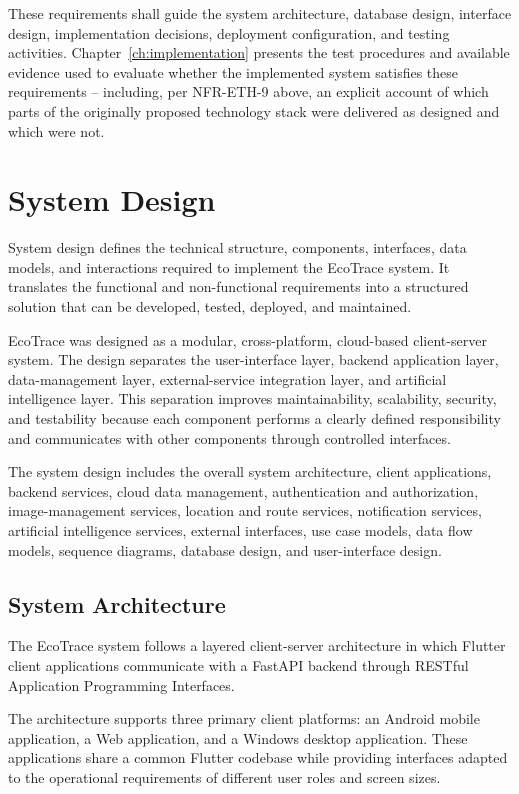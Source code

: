 These requirements shall guide the system architecture, database design,
interface design, implementation decisions, deployment configuration, and
testing activities. Chapter~\ref{ch:implementation} presents the test procedures
and available evidence used to evaluate whether the implemented system
satisfies these requirements -- including, per NFR-ETH-9 above, an explicit
account of which parts of the originally proposed technology stack were
delivered as designed and which were not.

\section{System Design}
\label{sec:system-design}

System design defines the technical structure, components, interfaces, data
models, and interactions required to implement the EcoTrace system. It
translates the functional and non-functional requirements into a structured
solution that can be developed, tested, deployed, and maintained.

EcoTrace was designed as a modular, cross-platform, cloud-based client-server
system. The design separates the user-interface layer, backend application layer,
data-management layer, external-service integration layer, and artificial
intelligence layer. This separation improves maintainability, scalability,
security, and testability because each component performs a clearly defined
responsibility and communicates with other components through controlled
interfaces.

The system design includes the overall system architecture, client
applications, backend services, cloud data management, authentication and
authorization, image-management services, location and route services,
notification services, artificial intelligence services, external interfaces, use
case models, data flow models, sequence diagrams, database design, and
user-interface design.

\subsection{System Architecture}
\label{sec:system-architecture}

The EcoTrace system follows a layered client-server architecture in which
Flutter client applications communicate with a FastAPI backend through
RESTful Application Programming Interfaces.

The architecture supports three primary client platforms: an Android mobile
application, a Web application, and a Windows desktop application. These
applications share a common Flutter codebase while providing interfaces
adapted to the operational requirements of different user roles and screen sizes.

